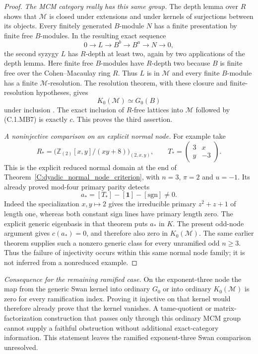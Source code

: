 \begin{proof}
\emph{The MCM category really has this same group.}
The depth lemma over $R$ shows that $\mathcal M$
is closed under extensions and under kernels of
surjections between its objects.
Every finitely generated $B$-module $N$ has a
finite presentation by finite free $B$-modules.
In the resulting exact sequence
\[
 0\longrightarrow L\longrightarrow B^b
       \longrightarrow B^a\longrightarrow N\longrightarrow0,
\]
the second syzygy $L$ has $R$-depth at least two,
again by two applications of the depth lemma.
Here finite free $B$-modules have $R$-depth two
because $B$ is finite free over the Cohen--Macaulay
ring $R$.
Thus $L$ is in $\mathcal M$ and every finite
$B$-module has a finite $\mathcal M$-resolution.
The resolution theorem, with these closure and
finite-resolution hypotheses, gives
\[
                         K_0(\mathcal M)\simeq G_0(B)
                                                               \tag{C.1.MB7}
\]
under inclusion \cite[II.7.6]{C-WeibelKbook2013}.
The exact inclusion of $R$-free lattices into
$\mathcal M$ followed by (C.1.MB7) is exactly $c$.
This proves the third assertion.

\emph{A noninjective comparison on an explicit normal node.}
For example take
\[
 R_*=
 \bigl(\mathbb Z_{(2)}[x,y]/(xy+8)\bigr)_{(2,x,y)},
 \qquad
 T_* = \begin{pmatrix}3&x\\y&-3\end{pmatrix}.
\]
This is the explicit reduced normal domain at the
end of Theorem~\ref{C:dyadic_normal_node_criterion},
with $n=3$, $\pi=2$ and $u=-1$.
Its already proved mod-four primary parity detects
\[
              a_*=[T_*]-[\mathbf1]-[\mathrm{sgn}]\ne0.
\]
Indeed the specialization $x,y\mapsto2$ gives
the irreducible primary $z^2+z+1$ of length one,
whereas both constant sign lines have primary length
zero.  The explicit generic eigenbasis in that
theorem puts $a_*$ in $K$.
The present odd-node argument gives $c(a_*)=0$,
and therefore also zero in $K_0(\mathcal M)$.
The same earlier theorem supplies such a nonzero
generic class for every unramified odd $n\geq3$.
Thus the failure of injectivity occurs within
this same normal node family; it is not inferred
from a nonreduced example.
\end{proof}

\noindent\emph{Consequence for the remaining ramified case.}
On the exponent-three node the map from the generic
Swan kernel into ordinary $G_0$ or into ordinary
$K_0(\mathcal M)$ is zero for every ramification index.
Proving it injective on that kernel would therefore
already prove that the kernel vanishes.
A tame-quotient or matrix-factorization construction
that passes only through this ordinary MCM group
cannot supply a faithful obstruction without
additional exact-category information.
This statement leaves the ramified exponent-three
Swan comparison unresolved.
